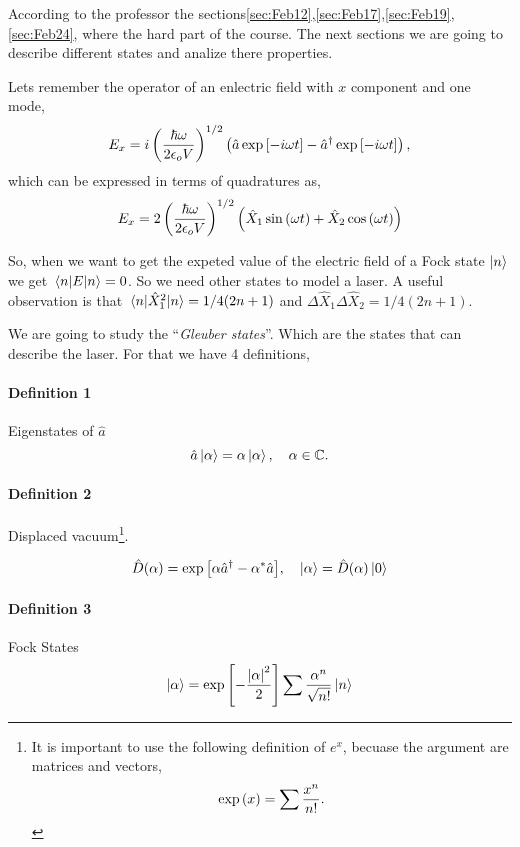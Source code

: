 \documentclass[a4paper]{tufte-handout} %
\newcommand{\hata}{\hat{a}}
\newcommand{\hatad}{\hat{a}^\dagger}
\newcommand{\QDi}{\hat{X}_1}
\newcommand{\QDj}{\hat{X}_2}
\begin{document}
According to the professor the sections\ref{sec:Feb12},\ref{sec:Feb17},\ref{sec:Feb19},\ref{sec:Feb24}, where the hard part of the course.
The next sections we are going to describe different states and analize there properties.

Lets remember the operator of an enlectric field with $x$ component and one mode,
\begin{gather*}
    E_x = i\left(\frac{\hbar\omega}{2\epsilon_o V}\right)^{1/2}\left(\hata\exp\qty[-i\omega t] - \hatad\exp\qty[-i\omega t]\right),
\end{gather*}
which can be expressed in terms of quadratures as,
\begin{gather*}
    E_x = 2\left(\frac{\hbar\omega}{2\epsilon_o V}\right)^{1/2}\qty( \hat{X}_1\sin\qty(\omega t) +  \hat{X}_2\cos\qty(\omega t))
\end{gather*}

So, when we want to get the expeted value of the electric field of a Fock state $\ket{n}$ we get $\expval{E}{n}=0$.
So we need other states to model a laser.
A useful observation is that $\expval{\QDi^2}{n}=1/4(2n+1)$ and $\Delta\QDi\Delta\QDj=1/4(2n+1)$.

We are going to study the ``\textit{Gleuber states}''.
Which are the states that can describe the laser.
For that we have 4 definitions,
\paragraph{Definition 1}
Eigenstates of $\hata$ \[\hata\ket{\alpha}=\alpha\ket{\alpha},\quad\alpha\in\mathbb{C}.\]

\paragraph{Definition 2}
Displaced vacuum\footnote{
    It is important to use the following definition of $e^x$, becuase the argument are matrices and vectors,
\[\exp\qty(x)=\sum\frac{x^n}{n!}.\]
}.

\begin{gather*}
    \hat{D}\qty(\alpha) = \exp\qty[\alpha\hatad-\alpha^*\hata],\quad\ket{\alpha}=\hat{D}(\alpha)\ket{0}
\end{gather*}

\paragraph{Definition 3}
Fock States
\begin{gather*}
    \ket{\alpha} = \exp\qty[-\frac{\abs{\alpha}^2}{2}]\sum\frac{\alpha^n}{\sqrt{n!}}\ket{n}
\end{gather*}
\end{document}
